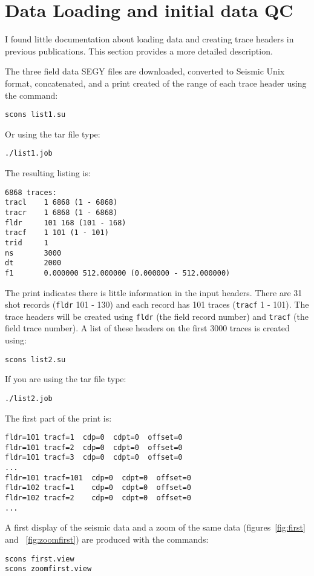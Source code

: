 \section{Data Loading and initial data QC}

I found little documentation about loading data and creating trace
headers in previous publications.  This section provides a more
detailed description.

The three field data SEGY files are downloaded, converted to Seismic 
Unix format, concatenated, and a print created of the range of each trace 
header using the command:
\begin{verbatim}
scons list1.su
\end{verbatim}
Or using the tar file type:
\begin{verbatim}
./list1.job
\end{verbatim}

The resulting listing is:
\begin{verbatim}
6868 traces:
tracl    1 6868 (1 - 6868)
tracr    1 6868 (1 - 6868)
fldr     101 168 (101 - 168)
tracf    1 101 (1 - 101)
trid     1
ns       3000
dt       2000
f1       0.000000 512.000000 (0.000000 - 512.000000)
\end{verbatim}

The print indicates there is little information in the input headers.
There are 31 shot records (\texttt{fldr} 101 - 130) and each record has 101
traces (\texttt{tracf} 1 - 101).  The trace headers will be created using \texttt{fldr}
(the field record number) and \texttt{tracf} (the field trace number).  A list 
of these headers on the first 3000 traces is created using:
\begin{verbatim}
scons list2.su 
\end{verbatim}

If you are using the tar file type:
\begin{verbatim}
./list2.job
\end{verbatim}

The first part of the print is: 
\begin{verbatim}
fldr=101 tracf=1  cdp=0	 cdpt=0  offset=0 
fldr=101 tracf=2  cdp=0	 cdpt=0  offset=0 	
fldr=101 tracf=3  cdp=0  cdpt=0  offset=0 
... 
fldr=101 tracf=101  cdp=0  cdpt=0  offset=0 
fldr=102 tracf=1    cdp=0  cdpt=0  offset=0 
fldr=102 tracf=2    cdp=0  cdpt=0  offset=0 
...
\end{verbatim}

A first display of the seismic data and a zoom of the same data 
(figures~\ref{fig:first} and ~\ref{fig:zoomfirst}) are
produced with the commands: 
\begin{verbatim}
scons first.view 
scons zoomfirst.view
\end{verbatim}

